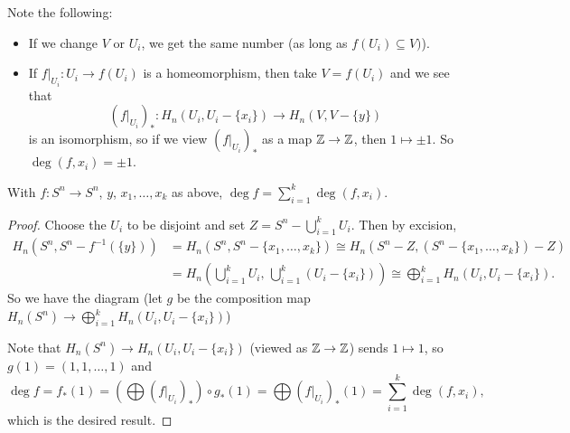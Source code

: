 \begin{remark}
  Note the following:
  \begin{itemize}
    \item If we change $V$ or $U_i$, we get the same
      number (as long as $f(U_i) \subseteq V)$).
    \item If $f|_{U_i} : U_i \to f(U_i)$ is a
      homeomorphism, then take $V = f(U_i)$ and
      we see that
      \[
        (f|_{U_i})_* : H_n(U_i, U_i - \{x_i\}) \to H_n(V, V - \{y\})
      \]
      is an isomorphism,
      so if we view $(f|_{U_i})_*$ as a map
      $\mathbb{Z} \to \mathbb{Z}$, then $1 \mapsto \pm 1$.
      So $\deg(f, x_i) = \pm 1$.
  \end{itemize}
\end{remark}

\begin{lemma}
  With $f : S^n \to S^n$, $y$, $x_1, \dots, x_k$
  as above, $\deg f = \sum_{i = 1}^k \deg(f, x_i)$.
\end{lemma}

\begin{proof}
  Choose the $U_i$ to be disjoint and set
  $Z = S^n - \bigcup_{i = 1}^k U_i$. Then by
  excision,
  \begin{align*}
    H_n(S^n, S^n - f^{-1}(\{y\}))
    &= H_n(S^n, S^n - \{x_1, \dots, x_k\})
    \cong H_n(S^n - Z, (S^n - \{x_1, \dots, x_k\}) - Z) \\
    &= H_n\left(\bigcup_{i = 1}^k U_i,\, \bigcup_{i = 1}^k (U_i - \{x_i\})\right)
    \cong \bigoplus_{i = 1}^k H_n(U_i, U_i - \{x_i\}).
  \end{align*}
  So we have the diagram (let $g$ be the composition
  map $H_n(S^n) \to \bigoplus_{i = 1}^k H_n(U_i, U_i - \{x_i\})$)
  \begin{center}
  \end{center}
  Note that $H_n(S^n) \to H_n(U_i, U_i - \{x_i\})$
  (viewed as $\mathbb{Z} \to \mathbb{Z}$) sends $1 \mapsto 1$,
  so $g(1) = (1, 1, \dots, 1)$ and
  \[
    \deg f = f_*(1) = \left(\bigoplus (f|_{U_i})_*\right)
    \circ g_*(1)
    = \bigoplus(f|_{U_i})_*(1)
    = \sum_{i = 1}^k \deg(f, x_i),
  \]
  which is the desired result.
\end{proof}

